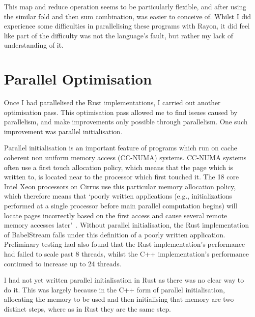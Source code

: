 This map and reduce operation seems to be particularly flexible, and after using the similar fold and then sum combination, was easier to conceive of. Whilst I did experience some difficulties in parallelising these programs with Rayon, it did feel like part of the difficulty was not the language's fault, but rather my lack of understanding of it.


\section{Parallel Optimisation}
Once I had parallelised the Rust implementations, I carried out another optimisation pass. This optimisation pass allowed me to find issues caused by parallelism, and make improvements only possible through parallelism. One such improvement was parallel initialisation.

Parallel initialisation is an important feature of programs which run on cache coherent non uniform memory access (CC-NUMA) systems. CC-NUMA systems often use a first touch allocation policy, which means that the page which is written to, is located near to the processor which first touched it. The 18 core Intel Xeon processors on Cirrus use this particular memory allocation policy, which therefore means that `poorly written applications (e.g., initializations  performed  at  a  single  processor  before  main  parallel computation  begins)  will  locate  pages  incorrectly based  on  the  first  access  and  cause  several  remote memory accesses later'~\cite{Bhuyan:2000}. Without parallel initialisation, the Rust implementation of BabelStream falls under this definition of a poorly written application. Preliminary testing had also found that the Rust implementation's performance had failed to scale past 8 threads, whilst the C++ implementation's performance continued to increase up to 24 threads. 

I had not yet written parallel initialisation in Rust as there was no clear way to do it. This was largely because in the C++ form of parallel initialisation, allocating the memory to be used and then initialising that memory are two distinct steps, where as in Rust they are the same step.


